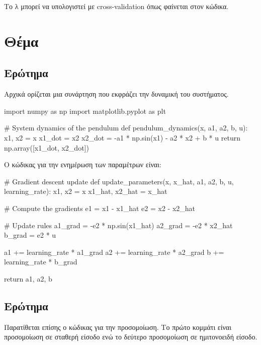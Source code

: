 \documentclass{article}
\newcommand{\eng}[1]{\foreignlanguage{english}{#1}} %
\begin{document}
Το λ μπορεί να υπολογιστεί με \eng{cross-validation} όπως φαίνεται στον κώδικα.

\clearpage
\section{Θέμα}

\subsection{Ερώτημα}

Αρχικά ορίζεται μια συνάρτηση που εκφράζει την δυναμική του συστήματος.

\begin{python}
import numpy as np
import matplotlib.pyplot as plt

# System dynamics of the pendulum
def pendulum_dynamics(x, a1, a2, b, u):
    x1, x2 = x
    x1_dot = x2
    x2_dot = -a1 * np.sin(x1) - a2 * x2 + b * u
    return np.array([x1_dot, x2_dot])
\end{python}
\FloatBarrier

Ο κώδικας για την ενημέρωση των παραμέτρων είναι:

\begin{python}
# Gradient descent update
def update_parameters(x, x_hat, a1, a2, b, u, learning_rate):
    x1, x2 = x
    x1_hat, x2_hat = x_hat

    # Compute the gradients
    e1 = x1 - x1_hat
    e2 = x2 - x2_hat

    # Update rules
    a1_grad = -e2 * np.sin(x1_hat)
    a2_grad = -e2 * x2_hat
    b_grad = e2 * u

    a1 += learning_rate * a1_grad
    a2 += learning_rate * a2_grad
    b += learning_rate * b_grad

    return a1, a2, b
\end{python}
\FloatBarrier

\clearpage
\subsection{Ερώτημα}

Παρατίθεται επίσης ο κώδικας για την προσομοίωση. Το πρώτο κομμάτι είναι προσομοίωση
σε σταθερή είσοδο ενώ το δεύτερο προσομοίωση σε ημιτονοειδή είσοδο.
\end{document}
